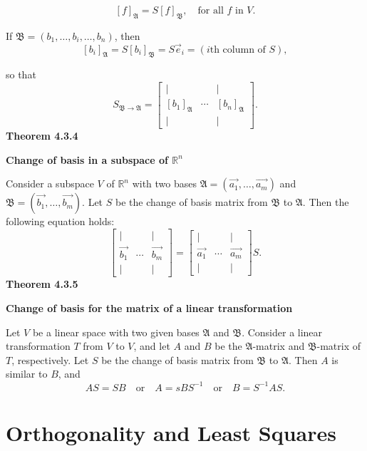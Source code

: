 \[[f]_{\mathfrak{A}}=S[f]_{\mathfrak{B}},\quad{}\textrm{for all }f\textrm{ in }V.\]
\par\noindent If $\mathfrak{B}=(b_{1},\ldots{},b_{i},\ldots{},b_{n})$, then
\[[b_{i}]_{\mathfrak{A}}=S[b_{i}]_{\mathfrak{B}}=S\vec{e}_{i}=(i\textrm{th column of }S),\]
\par\noindent so that
\[S_{\mathfrak{B}\rightarrow\mathfrak{A}}=\left[\begin{array}{ccc}|&&|\\{} [b_{1}]_{\mathfrak{A}}&\cdots{}&[b_{n}]_{\mathfrak{A}}\\{} |&&|\end{array}\right].\]
\textbf{Theorem 4.3.4}\\
\par\noindent\textbf{Change of basis in a subspace of $\mathbb{R}^{n}$}
\par\noindent Consider a subspace $V$ of $\mathbb{R}^{n}$ with two bases $\mathfrak{A}=(\vec{a_{1}},\ldots{},\vec{a_{m}})$ and $\mathfrak{B}=(\vec{b_{1}},\ldots{},\vec{b_{m}})$. Let $S$ be the change of basis matrix from $\mathfrak{B}$ to $\mathfrak{A}$. Then the following equation holds:
\[\left[\begin{array}{ccc}|&&|\\{} \vec{b_{1}}&\cdots{}&\vec{b_{m}}\\{} |&&|\end{array}\right]=\left[\begin{array}{ccc}|&&|\\{} \vec{a_{1}}&\cdots{}&\vec{a_{m}}\\{} |&&|\end{array}\right]S.\]
\textbf{Theorem 4.3.5}\\
\par\noindent\textbf{Change of basis for the matrix of a linear transformation}
\par\noindent Let $V$ be a linear space with two given bases $\mathfrak{A}$ and $\mathfrak{B}$. Consider a linear transformation $T$ from $V$ to $V$, and let $A$ and $B$ be the $\mathfrak{A}$-matrix and $\mathfrak{B}$-matrix of $T$, respectively. Let $S$ be the change of basis matrix from $\mathfrak{B}$ to $\mathfrak{A}$. Then $A$ is similar to $B$, and
\[AS=SB\quad{}\textrm{or}\quad{}A=sBS^{-1}\quad{}\textrm{or}\quad{}B=S^{-1}AS.\]

\section{Orthogonality and Least Squares}

